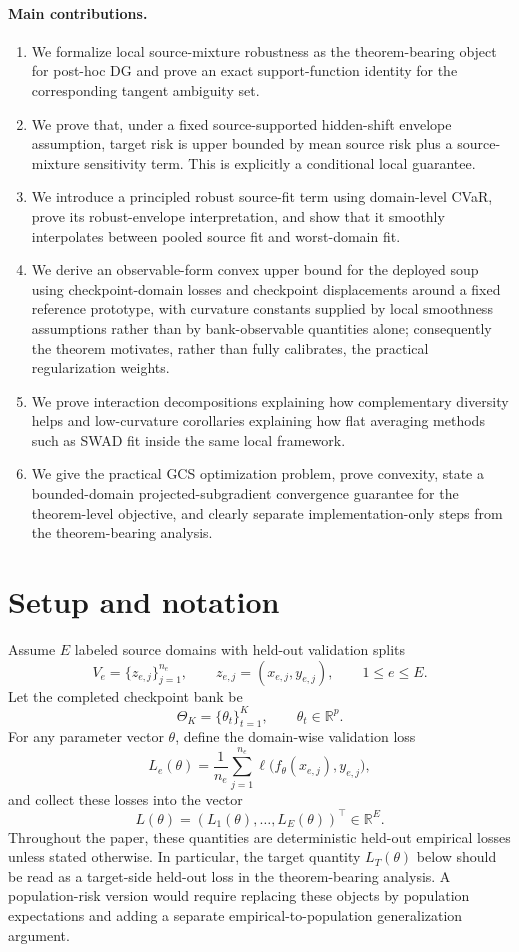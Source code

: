 \documentclass[11pt]{article}
\newcommand{\R}{\mathbb{R}}
\newcommand{\1}{\mathbf{1}}
\theoremstyle{plain}
\theoremstyle{definition}
\theoremstyle{remark}
\begin{document}
\paragraph{Main contributions.}
\begin{enumerate}[leftmargin=1.5em]
    \item We formalize local source-mixture robustness as the theorem-bearing object for post-hoc DG and prove an exact support-function identity for the corresponding tangent ambiguity set.
    \item We prove that, under a fixed source-supported hidden-shift envelope assumption, target risk is upper bounded by mean source risk plus a source-mixture sensitivity term. This is explicitly a conditional local guarantee.
    \item We introduce a principled robust source-fit term using domain-level CVaR, prove its robust-envelope interpretation, and show that it smoothly interpolates between pooled source fit and worst-domain fit.
    \item We derive an observable-form convex upper bound for the deployed soup using checkpoint-domain losses and checkpoint displacements around a fixed reference prototype, with curvature constants supplied by local smoothness assumptions rather than by bank-observable quantities alone; consequently the theorem motivates, rather than fully calibrates, the practical regularization weights.
    \item We prove interaction decompositions explaining how complementary diversity helps and low-curvature corollaries explaining how flat averaging methods such as SWAD fit inside the same local framework.
    \item We give the practical GCS optimization problem, prove convexity, state a bounded-domain projected-subgradient convergence guarantee for the theorem-level objective, and clearly separate implementation-only steps from the theorem-bearing analysis.
\end{enumerate}

\section{Setup and notation}
Assume $E$ labeled source domains with held-out validation splits
\[
V_e = \{z_{e,j}\}_{j=1}^{n_e}, \qquad z_{e,j} = (x_{e,j}, y_{e,j}), \qquad 1 \le e \le E.
\]
Let the completed checkpoint bank be
\[
\Theta_K = \{\theta_t\}_{t=1}^K, \qquad \theta_t \in \R^p.
\]
For any parameter vector $\theta$, define the domain-wise validation loss
\[
L_e(\theta) = \frac{1}{n_e} \sum_{j=1}^{n_e} \ell\bigl(f_{\theta}(x_{e,j}), y_{e,j}\bigr),
\]
and collect these losses into the vector
\[
L(\theta) = (L_1(\theta), \dots, L_E(\theta))^\top \in \R^E.
\]
Throughout the paper, these quantities are deterministic held-out empirical losses unless stated otherwise. In particular, the target quantity $L_T(\theta)$ below should be read as a target-side held-out loss in the theorem-bearing analysis. A population-risk version would require replacing these objects by population expectations and adding a separate empirical-to-population generalization argument.
\end{document}
